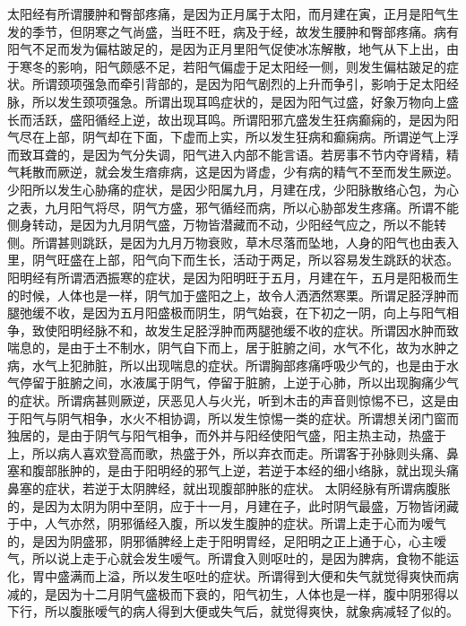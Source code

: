 \documentclass[a4paper,12pt,UTF8,twoside]{ctexbook}
\begin{document}
太阳经有所谓腰肿和臀部疼痛，是因为正月属于太阳，而月建在寅，正月是阳气生发的季节，但阴寒之气尚盛，当旺不旺，病及于经，故发生腰肿和臀部疼痛。病有阳气不足而发为偏枯跛足的，是因为正月里阳气促使冰冻解散，地气从下上出，由于寒冬的影响，阳气颇感不足，若阳气偏虚于足太阳经一侧，则发生偏枯跛足的症状。所谓颈项强急而牵引背部的，是因为阳气剧烈的上升而争引，影响于足太阳经脉，所以发生颈项强急。所谓出现耳鸣症状的，是因为阳气过盛，好象万物向上盛长而活跃，盛阳循经上逆，故出现耳鸣。所谓阳邪亢盛发生狂病癫痫的，是因为阳气尽在上部，阴气却在下面，下虚而上实，所以发生狂病和癫痫病。所谓逆气上浮而致耳聋的，是因为气分失调，阳气进入内部不能言语。若房事不节内夺肾精，精气耗散而厥逆，就会发生瘖痱病，这是因为肾虚，少有病的精气不至而发生厥逆。
少阳所以发生心胁痛的症状，是因少阳属九月，月建在戌，少阳脉散络心包，为心之表，九月阳气将尽，阴气方盛，邪气循经而病，所以心胁部发生疼痛。所谓不能侧身转动，是因为九月阴气盛，万物皆潜藏而不动，少阳经气应之，所以不能转侧。所谓甚则跳跃，是因为九月万物衰败，草木尽落而坠地，人身的阳气也由表入里，阴气旺盛在上部，阳气向下而生长，活动于两足，所以容易发生跳跃的状态。
阳明经有所谓洒洒振寒的症状，是因为阳明旺于五月，月建在午，五月是阳极而生的时候，人体也是一样，阴气加于盛阳之上，故令人洒洒然寒栗。所谓足胫浮肿而腿弛缓不收，是因为五月阳盛极而阴生，阴气始衰，在下初之一阴，向上与阳气相争，致使阳明经脉不和，故发生足胫浮肿而两腿弛缓不收的症状。所谓因水肿而致喘息的，是由于土不制水，阴气自下而上，居于脏腑之间，水气不化，故为水肿之病，水气上犯肺脏，所以出现喘息的症状。所谓胸部疼痛呼吸少气的，也是由于水气停留于脏腑之间，水液属于阴气，停留于脏腑，上逆于心肺，所以出现胸痛少气的症状。所谓病甚则厥逆，厌恶见人与火光，听到木击的声音则惊惕不已，这是由于阳气与阴气相争，水火不相协调，所以发生惊惕一类的症状。所谓想关闭门窗而独居的，是由于阴气与阳气相争，而外并与阳经使阳气盛，阳主热主动，热盛于上，所以病人喜欢登高而歌，热盛于外，所以弃衣而走。所谓客于孙脉则头痛、鼻塞和腹部胀肿的，是由于阳明经的邪气上逆，若逆于本经的细小络脉，就出现头痛鼻塞的症状，若逆于太阴脾经，就出现腹部肿胀的症状。
太阴经脉有所谓病腹胀的，是因为太阴为阴中至阴，应于十一月，月建在子，此时阴气最盛，万物皆闭藏于中，人气亦然，阴邪循经入腹，所以发生腹肿的症状。所谓上走于心而为嗳气的，是因为阴盛邪，阴邪循脾经上走于阳明胃经，足阳明之正上通于心，心主嗳气，所以说上走于心就会发生嗳气。所谓食入则呕吐的，是因为脾病，食物不能运化，胃中盛满而上溢，所以发生呕吐的症状。所谓得到大便和失气就觉得爽快而病减的，是因为十二月阴气盛极而下衰的，阳气初生，人体也是一样，腹中阴邪得以下行，所以腹胀嗳气的病人得到大便或失气后，就觉得爽快，就象病减轻了似的。
\end{document}
